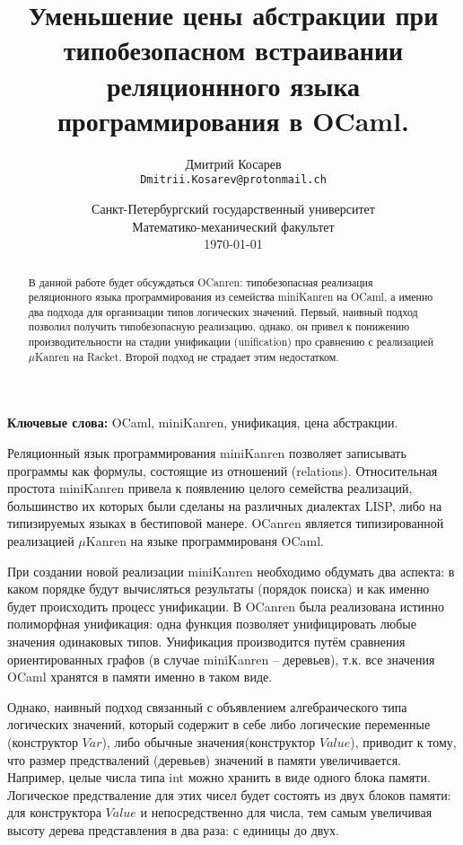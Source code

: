 \documentclass[10pt]{article}
\title{Уменьшение цены абстракции при типобезопасном встраивании реляционнного языка программирования в OCaml.}
\author{
        Дмитрий Косарев\\ \texttt{Dmitrii.Kosarev@protonmail.ch}
}
\date{
  Санкт-Петербургский государственный университет\\
  Математико-механический факультет\\
  \today
}
\begin{document}
\maketitle

\begin{abstract}
В данной работе будет обсуждаться OCanren: типобезопасная реализация реляционного языка программирования
из семейства miniKanren на OCaml, а именно два подхода для организации типов логических значений. Первый,
наивный подход позволил получить типобезопасную реализацию, однако, он привел к понижению производительности
на стадии унификации (unification) про сравнению с реализацией $\mu$Kanren на Racket. Второй подход не 
страдает этим недостатком.

\end{abstract}

\textbf{Ключевые слова:} OCaml, miniKanren, унификация, цена абстракции.

\vspace{5mm}

Реляционный язык программирования miniKanren позволяет записывать программы как формулы, состоящие из отношений
(relations). Относительная простота miniKanren привела к появлению целого семейства реализаций, большинство их 
которых были сделаны на различных диалектах LISP, либо на типизируемых языках в бестиповой манере. OCanren 
является типизированной реализацией $\mu$Kanren на языке программированя OCaml.

При создании новой реализации miniKanren необходимо обдумать два аспекта: в каком порядке будут вычисляться 
результаты (порядок поиска) и как именно будет происходить процесс унификации. В OCanren была реализована истинно 
полиморфная унификация: одна функция позволяет унифицировать любые значения одинаковых типов. Унификация производится
путём сравнения ориентированных графов (в случае miniKanren -- деревьев), т.к. все значения OCaml хранятся в 
памяти именно в таком виде.

Однако, наивный подход связанный с объявлением алгебраического типа логических значений, который содержит в себе 
либо логические переменные (конструктор $Var$), либо обычные значения(конструктор $Value$), приводит к тому, что 
размер предствалений (деревьев) значений в памяти увеличивается. 
Например, целые числа типа int можно хранить в виде одного блока памяти. Логическое предстваление для этих чисел
будет состоять из двух блоков памяти: для конструктора $Value$ и непосредственно для числа, тем самым увеличивая 
высоту дерева представления в два раза: с единицы до двух.
\end{document}
